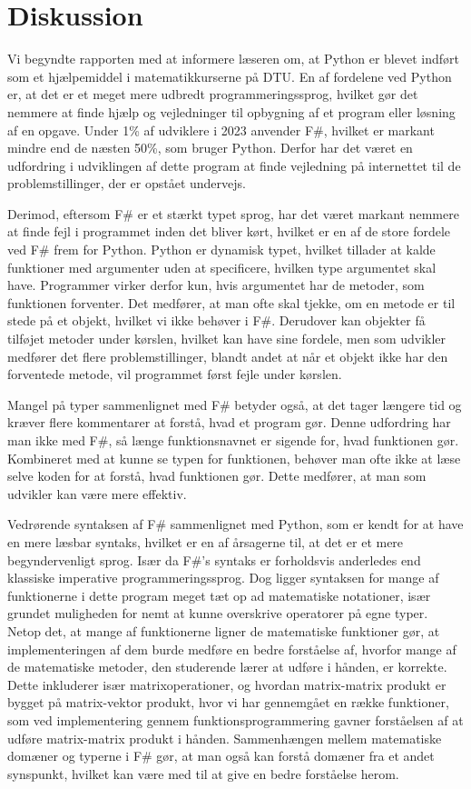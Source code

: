 \section{Diskussion}
Vi begyndte rapporten med at informere læseren om, at Python er blevet indført som et hjælpemiddel i matematikkurserne på DTU. En af fordelene ved Python er, at det er et meget mere udbredt programmeringssprog, hvilket gør det nemmere at finde hjælp og vejledninger til opbygning af et program eller løsning af en opgave. Under 1\% af udviklere i 2023 anvender F\#, hvilket er markant mindre end de næsten 50\%, som bruger Python. Derfor har det været en udfordring i udviklingen af dette program at finde vejledning på internettet til de problemstillinger, der er opstået undervejs.

Derimod, eftersom F\# er et stærkt typet sprog, har det været markant nemmere at finde fejl i programmet inden det bliver kørt, hvilket er en af de store fordele ved F\# frem for Python. Python er dynamisk typet, hvilket tillader at kalde funktioner med argumenter uden at specificere, hvilken type argumentet skal have. Programmer virker derfor kun, hvis argumentet har de metoder, som funktionen forventer. Det medfører, at man ofte skal tjekke, om en metode er til stede på et objekt, hvilket vi ikke behøver i F\#. Derudover kan objekter få tilføjet metoder under kørslen, hvilket kan have sine fordele, men som udvikler medfører det flere problemstillinger, blandt andet at når et objekt ikke har den forventede metode, vil programmet først fejle under kørslen.

Mangel på typer sammenlignet med F\# betyder også, at det tager længere tid og kræver flere kommentarer at forstå, hvad et program gør. Denne udfordring har man ikke med F\#, så længe funktionsnavnet er sigende for, hvad funktionen gør. Kombineret med at kunne se typen for funktionen, behøver man ofte ikke at læse selve koden for at forstå, hvad funktionen gør. Dette medfører, at man som udvikler kan være mere effektiv.

Vedrørende syntaksen af F\# sammenlignet med Python, som er kendt for at have en mere læsbar syntaks, hvilket er en af årsagerne til, at det er et mere begyndervenligt sprog. Især da F\#'s syntaks er forholdsvis anderledes end klassiske imperative programmeringssprog. Dog ligger syntaksen for mange af funktionerne i dette program meget tæt op ad matematiske notationer, især grundet muligheden for nemt at kunne overskrive operatorer på egne typer. Netop det, at mange af funktionerne ligner de matematiske funktioner gør, at implementeringen af dem burde medføre en bedre forståelse af, hvorfor mange af de matematiske metoder, den studerende lærer at udføre i hånden, er korrekte. Dette inkluderer især matrixoperationer, og hvordan matrix-matrix produkt er bygget på matrix-vektor produkt, hvor vi har gennemgået en række funktioner, som ved implementering gennem funktionsprogrammering gavner forståelsen af at udføre matrix-matrix produkt i hånden. Sammenhængen mellem matematiske domæner og typerne i F\# gør, at man også kan forstå domæner fra et andet synspunkt, hvilket kan være med til at give en bedre forståelse herom.

